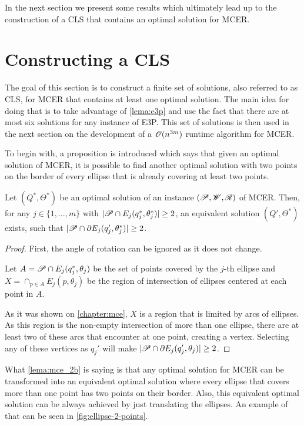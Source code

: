 In the next section we present some results which ultimately lead up to the construction of a CLS that contains an optimal solution for MCER.

\section{Constructing a CLS}

The goal of this section is to construct a finite set of solutions, also referred to as CLS, for MCER that contains at least one optimal solution.
The main idea for doing that is to take advantage of \autoref{lema:e3p} and use the fact that there are at most six solutions for any instance of E3P.
This set of solutions is then used in the next section on the development of a $\mathscr{O}(n^{3m})$ runtime algorithm for MCER.

To begin with, a proposition is introduced which says that given an optimal solution of MCER, it is possible to find another optimal solution with two points on the border of every ellipse that is already covering at least two points.

\begin{proposicao}\label{lema:mce_2b}
	Let $(Q^*, \Theta^*)$ be an optimal solution of an instance $(\mathscr{P}, \mathscr{W}, \mathscr{R})$ of MCER. 
	Then, for any $j\in\{1, \dots, m\}$ with $|\mathscr{P} \cap E_j(q_j^*, \theta_j^*)|\ge2$, 
	an equivalent solution $(Q', \Theta^*)$ exists, such that $|\mathscr{P} \cap \partial E_j(q_j', \theta_j^*)|\ge 2$.
\end{proposicao}

\begin{proof}
	First, the angle of rotation can be ignored as it does not change.
	
	Let $A=\mathscr{P} \cap E_j(q_j^*, \theta_j)$ be the set of points covered by the $j$-th ellipse and $X=\cap_{p \in A}E_j(p, \theta_j)$ be the region of intersection of ellipses centered at each point in $A$.

	As it was shown on \autoref{chapter:mce}, $X$ is a region that is limited by arcs of ellipses. As this region is the non-empty intersection of more than one ellipse, there are at least two of these arcs that encounter at one point, creating a vertex. Selecting any of these vertices as $q_j'$ will make $|\mathscr{P} \cap \partial E_j(q_j', \theta_j)| \ge 2$.
	
\end{proof}

What \autoref{lema:mce_2b} is saying is that any optimal solution for MCER can be transformed into an equivalent optimal solution where every ellipse that covers more than one point has two points on their border. Also, this equivalent optimal solution can be always achieved by just translating the ellipses. An example of that can be seen in \autoref{fig:ellipse-2-points}. 

